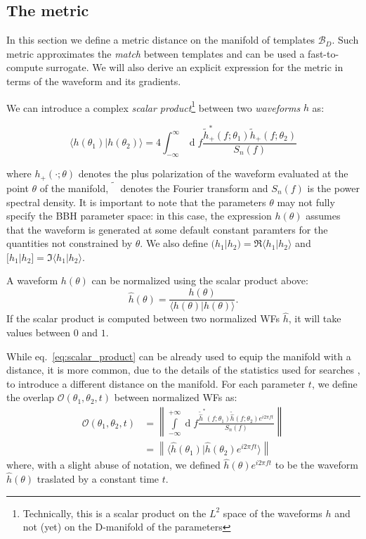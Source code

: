 \documentclass[twocolumn,showpacs,preprintnumbers,nofootinbib,prd,
superscriptaddress,10pt]{revtex4-1}
\renewcommand{\d}[1]{\ensuremath{\operatorname{d}\!{#1}}}
\newcommand{\scalar}[2]{\langle #1|#2 \rangle}
\newcommand{\rescalar}[2]{( #1|#2 )}
\newcommand{\imscalar}[2]{[ #1|#2 ]}
\begin{document}
\subsection{The metric} \label{sec:metric}

In this section we define a metric distance on the manifold of templates $\mathcal{B}_D$. Such metric approximates the {\it match} between templates and can be used a fast-to-compute surrogate. We will also derive an explicit expression for the metric in terms of the waveform and its gradients.

We can introduce a complex \textit{scalar product}\footnote{
Technically, this is a scalar product on the $L^2$ space of the waveforms $h$ and not (yet) on the D-manifold of the parameters
} between two \textit{waveforms} $h$ as:

\begin{equation} \label{eq:scalar_product}
	\scalar{h(\theta_1)}{h(\theta_2)} = 4 \int_{-\infty}^{\infty} \d{f} \frac{\tilde{h}_+^*(f;\theta_1) \tilde{h}_+(f;\theta_2)}{S_n(f)}
\end{equation}

where $h_+(\cdot; \theta)$ denotes the plus polarization of the waveform evaluated at the point $\theta$ of the manifold, $\tilde{\phantom{h}}$ denotes the Fourier transform and $S_n(f)$ is the power spectral density.
It is important to note that the parameters $\theta$ may not fully specify the BBH parameter space: in this case, the expression $h(\theta)$ assumes that the waveform is generated at some default constant paramters for the quantities not constrained by $\theta$.
We also define $\rescalar{h_1}{h_2} = \Re\scalar{h_1}{h_2}$ and $\imscalar{h_1}{h_2} = \Im\scalar{h_1}{h_2}$.

A waveform $h(\theta)$ can be normalized using the scalar product above:
\begin{equation} \label{eq:normalization}
	\hat{h}(\theta) = \frac{h(\theta)}{\scalar{h(\theta)}{h(\theta)}}.
\end{equation}
If the scalar product is computed between two normalized WFs $\hat{h}$, it will take values between $0$ and $1$.

While eq.~\eqref{eq:scalar_product} can be already used to equip the manifold with a distance, it is more common, due to the details of the statistics used for searches \cite{something}, to introduce a different distance on the manifold.
For each parameter $t$, we define the overlap $\mathcal{O}(\theta_1,\theta_2, t)$ between normalized WFs as:
\begin{align}\label{eq:overlap}
	\mathcal{O}(\theta_1,\theta_2, t) &= \left\| \int\limits_{-\infty}^{+\infty} \d{f} \frac{\tilde{\hat{h}}^*(f;\theta_1)\tilde{\hat{h}}(f;\theta_2) e^{i2\pi ft}}{S_n(f)} \right\| \nonumber\\
	&= \left\| \scalar{\hat{h}(\theta_1)}{\hat{h}(\theta_2)e^{i 2\pi ft}} \right\| 
\end{align}
where, with a slight abuse of notation, we defined $\hat{h}(\theta)e^{i 2\pi ft}$ to be the waveform $\hat{h}(\theta)$ traslated by a constant time $t$.
\end{document}
